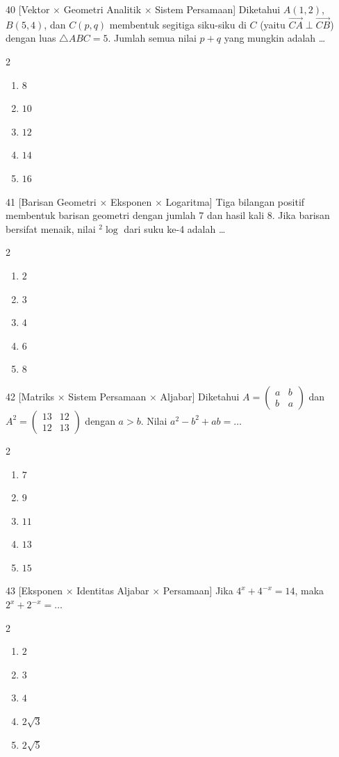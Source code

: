 \documentclass[11pt]{article}
\newenvironment{pilB}{%
  \par\smallskip\begin{multicols}{2}
  \begin{enumerate}[label=(\alph*),leftmargin=*,itemsep=1pt,topsep=3pt]}%
  {\end{enumerate}\end{multicols}}
\begin{document}
\begin{soal}{40 \normalfont\small[Vektor $\times$ Geometri Analitik $\times$ Sistem Persamaan]}
Diketahui $A(1,2)$, $B(5,4)$, dan $C(p,q)$ membentuk segitiga siku-siku di $C$
(yaitu $\vec{CA}\perp\vec{CB}$) dengan luas $\triangle ABC=5$.
Jumlah semua nilai $p+q$ yang mungkin adalah \ldots
\begin{pilB}
  \item $8$ \item $10$ \item $12$ \item $14$ \item $16$
\end{pilB}
\end{soal}

\begin{soal}{41 \normalfont\small[Barisan Geometri $\times$ Eksponen $\times$ Logaritma]}
Tiga bilangan positif membentuk barisan geometri dengan jumlah 7 dan hasil kali 8.
Jika barisan bersifat menaik, nilai ${}^2\!\log$ dari suku ke-4 adalah \ldots
\begin{pilB}
  \item $2$ \item $3$ \item $4$ \item $6$ \item $8$
\end{pilB}
\end{soal}

\begin{soal}{42 \normalfont\small[Matriks $\times$ Sistem Persamaan $\times$ Aljabar]}
Diketahui $A=\begin{pmatrix}a&b\\b&a\end{pmatrix}$ dan $A^2=\begin{pmatrix}13&12\\12&13\end{pmatrix}$
dengan $a>b$. Nilai $a^2-b^2+ab=\ldots$
\begin{pilB}
  \item $7$ \item $9$ \item $11$ \item $13$ \item $15$
\end{pilB}
\end{soal}

\begin{soal}{43 \normalfont\small[Eksponen $\times$ Identitas Aljabar $\times$ Persamaan]}
Jika $4^x+4^{-x}=14$, maka $2^x+2^{-x}=\ldots$
\begin{pilB}
  \item $2$ \item $3$ \item $4$ \item $2\sqrt{3}$ \item $2\sqrt{5}$
\end{pilB}
\end{soal}
\end{document}
